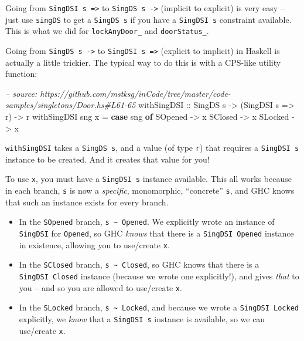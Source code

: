 \documentclass[]{article}
\newenvironment{Shaded}{\begin{snugshade}}{\end{snugshade}}
\newcommand{\CommentTok}[1]{\textcolor[rgb]{0.56,0.35,0.01}{\textit{#1}}}
\newcommand{\DataTypeTok}[1]{\textcolor[rgb]{0.13,0.29,0.53}{#1}}
\newcommand{\FunctionTok}[1]{\textcolor[rgb]{0.00,0.00,0.00}{#1}}
\newcommand{\KeywordTok}[1]{\textcolor[rgb]{0.13,0.29,0.53}{\textbf{#1}}}
\newcommand{\NormalTok}[1]{#1}
\newcommand{\OtherTok}[1]{\textcolor[rgb]{0.56,0.35,0.01}{#1}}
\begin{document}
Going from \texttt{SingDSI\ s\ =\textgreater{}} to
\texttt{SingDS\ s\ -\textgreater{}} (implicit to explicit) is very easy -- just
use \texttt{singDS} to get a \texttt{SingDS\ s} if you have a
\texttt{SingDSI\ s} constraint available. This is what we did for
\texttt{lockAnyDoor\_} and \texttt{doorStatus\_}.

Going from \texttt{SingDS\ s\ -\textgreater{}} to
\texttt{SingDSI\ s\ =\textgreater{}} (explicit to implicit) in Haskell is
actually a little trickier. The typical way to do this is with a CPS-like
utility function:

\begin{Shaded}
\begin{Highlighting}[]
\CommentTok{-- source: https://github.com/mstksg/inCode/tree/master/code-samples/singletons/Door.hs#L61-65}
\OtherTok{withSingDSI ::} \DataTypeTok{SingDS}\NormalTok{ s }\OtherTok{->}\NormalTok{ (}\DataTypeTok{SingDSI}\NormalTok{ s }\OtherTok{=>}\NormalTok{ r) }\OtherTok{->}\NormalTok{ r}
\NormalTok{withSingDSI sng x }\FunctionTok{=} \KeywordTok{case}\NormalTok{ sng }\KeywordTok{of}
    \DataTypeTok{SOpened} \OtherTok{->}\NormalTok{ x}
    \DataTypeTok{SClosed} \OtherTok{->}\NormalTok{ x}
    \DataTypeTok{SLocked} \OtherTok{->}\NormalTok{ x}
\end{Highlighting}
\end{Shaded}

\texttt{withSingDSI} takes a \texttt{SingDS\ s}, and a value (of type
\texttt{r}) that requires a \texttt{SingDSI\ s} instance to be created. And it
creates that value for you!

To use \texttt{x}, you must have a \texttt{SingDSI\ s} instance available. This
all works because in each branch, \texttt{s} is now a \emph{specific},
monomorphic, ``concrete'' \texttt{s}, and GHC knows that such an instance exists
for every branch.

\begin{itemize}
\tightlist
\item
  In the \texttt{SOpened} branch,
  \texttt{s\ \textasciitilde{}\ \textquotesingle{}Opened}. We explicitly wrote
  an instance of \texttt{SingDSI} for \texttt{\textquotesingle{}Opened}, so GHC
  \emph{knows} that there is a \texttt{SingDSI\ \textquotesingle{}Opened}
  instance in existence, allowing you to use/create \texttt{x}.
\item
  In the \texttt{SClosed} branch,
  \texttt{s\ \textasciitilde{}\ \textquotesingle{}Closed}, so GHC knows that
  there is a \texttt{SingDSI\ \textquotesingle{}Closed} instance (because we
  wrote one explicitly!), and gives \emph{that} to you -- and so you are allowed
  to use/create \texttt{x}.
\item
  In the \texttt{SLocked} branch,
  \texttt{s\ \textasciitilde{}\ \textquotesingle{}Locked}, and because we wrote
  a \texttt{SingDSI\ \textquotesingle{}Locked} explicitly, we \emph{know} that a
  \texttt{SingDSI\ s} instance is available, so we can use/create \texttt{x}.
\end{itemize}
\end{document}
